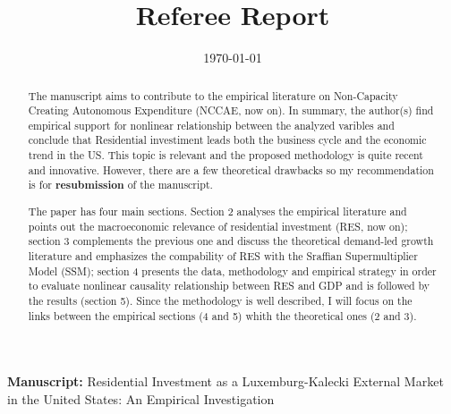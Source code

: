 \documentclass[11pt]{article}
\date{\today}
\title{Referee Report}
\begin{document}
\maketitle
\noindent \textbf{Manuscript:} Residential Investment as a Luxemburg-Kalecki External Market in the United States: An Empirical Investigation

\begin{abstract}
The manuscript aims to contribute to the empirical literature on Non-Capacity Creating Autonomous Expenditure (NCCAE, now on). In summary, the author(s) find empirical support for nonlinear relationship between the analyzed varibles and conclude that Residential investiment leads both the business cycle and the economic trend in the US. This topic is relevant and the proposed methodology is quite recent and innovative. However, there are a few theoretical drawbacks so my recommendation is for \textbf{resubmission} of the manuscript.

The paper has four main sections. Section 2 analyses the empirical literature and points out the macroeconomic relevance of residential investment (RES, now on); section 3 complements the previous one and discuss the theoretical demand-led growth literature and emphasizes the compability of RES with the Sraffian Supermultiplier Model (SSM); section 4 presents the data, methodology and empirical strategy in order to evaluate nonlinear causality relationship between RES and GDP and is followed by the results (section 5). Since the methodology is well described, I will focus on the links between the empirical sections (4 and 5) whith the theoretical ones (2 and 3).
\end{abstract}
\end{document}
